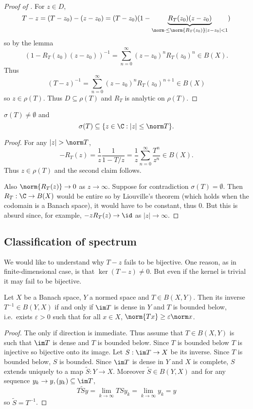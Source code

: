 \documentclass[a4paper]{article}
\begin{document}
\begin{proof}[Proof of ]
  For \(z \in D\),
  \[
    T - z
    = (T - z_0) - (z - z_0)
    = (T - z_0) (1 - \underbrace{R_T(z_0) (z - z_0)}_{\norm \cdot \leq \norm{R_T(z_0)} |z - z_0| < 1})
  \]
  so by the lemma
  \[
    (1 - R_T(z_0) (z - z_0))^{-1} = \sum_{n = 0}^\infty (z - z_0)^n R_T(z_0)^n \in B(X).
  \]
  Thus
  \[
    (T - z)^{-1} = \sum_{n = 0}^\infty (z - z_0)^n R_T(z_0)^{n + 1} \in B(X)
  \]
  so \(z \in \rho(T)\). Thus \(D \subseteq \rho(T)\) and \(R_T\) is analytic on \(\rho(T)\).
\end{proof}

\begin{corollary}
  \(\sigma(T) \neq \emptyset\) and
  \[
    \sigma(T) \subseteq \{z \in \C: |z| \leq \norm T\}.
  \]
\end{corollary}

\begin{proof}
  For any \(|z| > \norm T\),
  \[
    - R_T(z) = \frac{1}{z} \frac{1}{1 - T/z} = \frac{1}{z} \sum_{n = 0}^\infty \frac{T^n}{z^n} \in B(X).
  \]
  Thus \(z \in \rho(T)\) and the second claim follows.

  Also \(\norm{R_T(z)} \to 0\) as \(z \to \infty\). Suppose for contradiction \(\sigma(T) = \emptyset\). Then \(R_T: \C \to B(X)\) would be entire so by Liouville's theorem (which holds when the codomain is a Banach space), it would have to be constant, thus \(0\). But this is absurd since, for example, \(-z R_T(z) \to \id\) as \(|z| \to \infty\).
\end{proof}

\subsection{Classification of spectrum}

We would like to understand why \(T - z\) fails to be bijective. One reason, as in finite-dimensional case, is that \(\ker(T - z) \neq 0\). But even if the kernel is trivial it may fail to be bijective.

\begin{proposition}
  Let \(X\) be a Banach space, \(Y\) a normed space and \(T \in B(X, Y)\). Then its inverse \(T^{-1} \in B(Y, X)\) if and only if \(\im T\) is dense in \(Y\) and \(T\) is bounded below, i.e.\ exists \(\varepsilon > 0\) such that for all \(x \in X\), \(\norm{Tx} \geq \varepsilon \norm x\).
\end{proposition}

\begin{proof}
  The only if direction is immediate. Thus assume that \(T \in B(X, Y)\) is such that \(\im T\) is dense and \(T\) is bounded below. Since \(T\) is bounded below \(T\) is injective so bijective onto its image. Let \(S: \im T \to X\) be its inverse. Since \(T\) is bounded below, \(S\) is bounded. Since \(\im T\) is dense in \(Y\) and \(X\) is complete, \(S\) extends uniquely to a map \(\tilde S: Y \to X\). Moreover \(\tilde S \in B(Y, X)\) and for any sequence \(y_k \to y, (y_k) \subseteq \im T\),
  \[
    T \tilde S y = \lim_{k \to \infty} TS y_k = \lim_{k \to \infty} y_k = y
  \]
  so \(\tilde S = T^{-1}\).
\end{proof}
\end{document}
